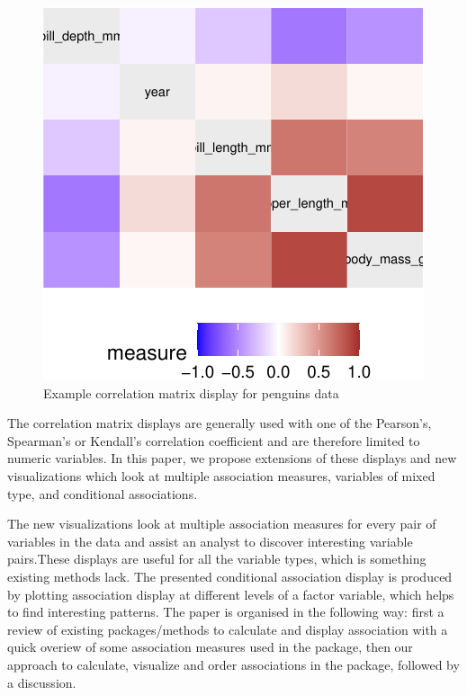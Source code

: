 \begin{Schunk}
\begin{figure}

{\centering \includegraphics{rj_paper_files/figure-latex/corrgram-1} 

}

\caption[Example correlation matrix display for penguins data]{Example correlation matrix display for penguins data}\label{fig:corrgram}
\end{figure}
\end{Schunk}

The correlation matrix displays are generally used with one of the
Pearson's, Spearman's or Kendall's correlation coefficient and are
therefore limited to numeric variables. In this paper, we propose
extensions of these displays and new visualizations which look at
multiple association measures, variables of mixed type, and conditional
associations.

The new visualizations look at multiple association measures for every
pair of variables in the data and assist an analyst to discover
interesting variable pairs.These displays are useful for all the
variable types, which is something existing methods lack. The presented
conditional association display is produced by plotting association
display at different levels of a factor variable, which helps to find
interesting patterns. The paper is organised in the following way: first
a review of existing packages/methods to calculate and display
association with a quick overiew of some association measures used in
the package, then our approach to calculate, visualize and order
associations in the package, followed by a discussion.


